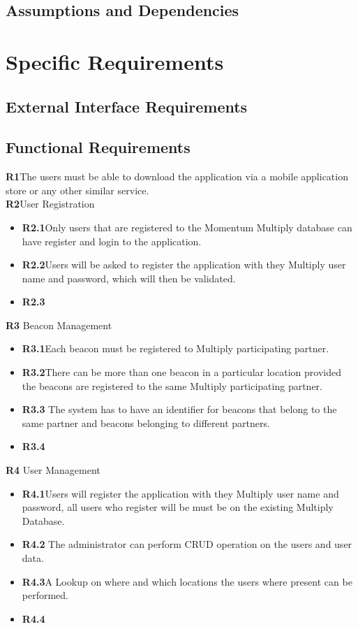 \documentclass[11pt]{article}
\begin{document}
\subsection{Assumptions and Dependencies}
\section{Specific Requirements}
\subsection{External Interface Requirements}
\subsection{Functional Requirements}
\textbf{R1}The users must be able to download the application via a mobile application store or any other similar service.\\ \textbf{R2}User Registration
\begin{itemize}	
	\item \textbf{R2.1}Only users that are registered to the Momentum Multiply database can have register and login to the application.
	\item \textbf{R2.2}Users will be asked to register the application with they Multiply user name and password, which will then be validated.
	\item 	\textbf{R2.3}
\end{itemize}
\textbf{R3} Beacon Management
\begin{itemize}	
	\item \textbf{R3.1}Each beacon must be registered to Multiply participating partner.
	\item 	\textbf{R3.2}There can be more than one beacon in a particular location provided the beacons are registered to the same Multiply participating partner.
	\item \textbf{R3.3} The system has to have an identifier for beacons that belong to the same partner and beacons belonging to different partners.
	\item \textbf{R3.4} 
\end{itemize}
\textbf{R4} User Management
\begin{itemize}	
	\item \textbf{R4.1}Users will register the application with they Multiply user name and password, all users who register will be must be on the existing Multiply Database. 
	\item \textbf{R4.2} The administrator can perform CRUD operation on the users and user data. 
	\item \textbf{R4.3}A Lookup on where and which locations the users where present can be performed.
	\item \textbf{R4.4} 
\end{itemize}
\end{document}
